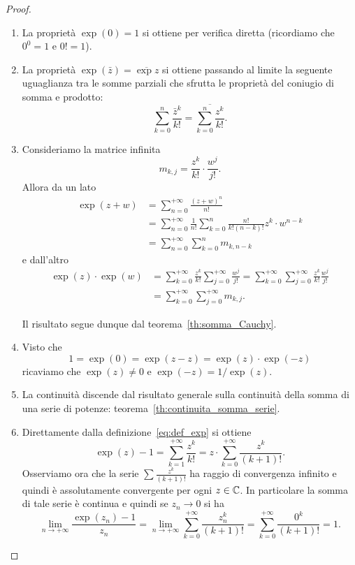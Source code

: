 \begin{proof}
\mymark{*}
\begin{enumerate}
\item
La proprietà $\exp(0)=1$ si ottiene per verifica diretta (ricordiamo che $0^0=1$
e $0!=1$).

\item La proprietà $\exp(\bar z) = \overline{\exp z}$ si ottiene
passando al limite la seguente uguaglianza tra le somme parziali
che sfrutta le proprietà del coniugio di somma e prodotto:
\[
\sum_{k=0}^{n} \frac{\bar z^k}{k!} = \overline{\sum_{k=0}^n \frac{z^k}{k!}}.
\]


\item
Consideriamo la matrice infinita
\[
m_{k,j}  = \frac{z^k}{k!} \cdot \frac{w^j}{j!}.
\]
Allora da un lato
\begin{align*}
 \exp(z+w)
 &= \sum_{n=0}^{+\infty} \frac{(z+w)^n}{n!}\\
 &= \sum_{n=0}^{+\infty} \frac{1}{n!}\sum_{k=0}^n \frac{n!}{k!(n-k)!} z^k\cdot w^{n-k}\\
 &= \sum_{n=0}^{+\infty} \sum_{k=0}^n m_{k, n-k}
\end{align*}
e dall'altro
\begin{align*}
 \exp(z) \cdot \exp(w)
 &= \sum_{k=0}^{+\infty}\frac{z^k}{k!} \sum_{j=0}^{+\infty}\frac{w^j}{j!}
 = \sum_{k=0}^{+\infty}\sum_{j=0}^{+\infty}\frac{z^k}{k!} \frac{w^j}{j!} \\
 &= \sum_{k=0}^{+\infty}\sum_{j=0}^{+\infty} m_{k,j}.
\end{align*}

Il risultato segue dunque dal teorema~\ref{th:somma_Cauchy}.

\item
Visto che
\[
  1 = \exp( 0) = \exp(z-z) = \exp(z) \cdot \exp(-z)
\]
ricaviamo che $\exp(z)\neq 0$ e $\exp(-z) =  1 / \exp(z)$.

\item
La continuità discende dal risultato generale sulla continuità della
somma di una serie di potenze: teorema~\ref{th:continuita_somma_serie}.

\item
Direttamente dalla definizione~\eqref{eq:def_exp}
si ottiene
\[
 \exp(z) - 1 = \sum_{k=1}^{+\infty} \frac{z^k}{k!}
 = z \cdot \sum_{k=0}^{+\infty} \frac{z^k}{(k+1)!}.
\]
Osserviamo ora che la serie $\sum \frac{z^k}{(k+1)!}$ ha raggio di
convergenza infinito e quindi è assolutamente convergente per ogni $z\in \mathbb C$.
In particolare la somma di tale serie è continua e
quindi se $z_n \to 0$ si ha
\[
\lim_{n\to+\infty }\frac{\exp(z_n) - 1}{z_n}
   =  \lim_{n\to+\infty} \sum_{k=0}^{+\infty} \frac{z_n^k}{(k+1)!}
   = \sum_{k=0}^{+\infty}\frac{0^k}{(k+1)!} = 1.
\]
\end{enumerate}
\end{proof}

